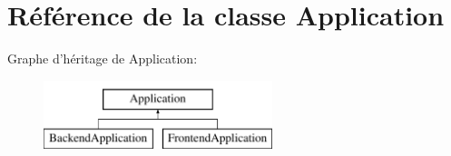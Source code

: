 \hypertarget{class_library_1_1_application}{\section{Référence de la classe Application}
\label{class_library_1_1_application}
}
Graphe d'héritage de Application\+:\begin{figure}[H]
\begin{center}
\leavevmode
\includegraphics[height=2.000000cm]{class_library_1_1_application}
\end{center}
\end{figure}
